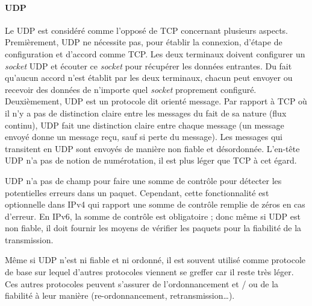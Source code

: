 \paragraph{UDP}
Le \gls{UDP} est considéré comme l'opposé de \gls{TCP} concernant plusieurs 
aspects. Premièrement, \gls{UDP} ne nécessite pas, pour établir la connexion, d'étape 
de configuration et d'accord comme \gls{TCP}. Les deux terminaux doivent 
configurer un \textit{socket} \gls{UDP} et écouter ce \textit{socket} pour récupérer 
les données entrantes. 
Du fait qu'aucun accord n'est établit par les deux terminaux, chacun 
peut envoyer ou recevoir des données de n'importe quel \textit{socket} proprement 
configuré.
Deuxièmement, \gls{UDP} est un protocole dit \og orienté message\fg{}. Par 
rapport à \gls{TCP} où il n'y a pas de distinction claire entre les messages du fait 
de sa nature (flux continu), \gls{UDP} fait une distinction claire entre chaque 
message (un message envoyé donne un message reçu, sauf si perte du 
message). Les messages qui transitent en \gls{UDP} sont envoyés de manière 
non fiable et désordonnée. L'en-tête \gls{UDP} n'a pas de notion de numérotation, il 
est plus léger que \gls{TCP} à cet égard.

\gls{UDP} n'a pas de champ pour faire une somme de contrôle pour détecter les 
potentielles erreurs dans un paquet. Cependant, cette fonctionnalité est optionnelle 
dans IPv4 qui rapport une somme de contrôle remplie de zéros en cas d'erreur. En 
IPv6, la somme de contrôle est obligatoire ; donc même si \gls{UDP} est non fiable, 
il doit fournir les moyens de vérifier les paquets pour la fiabilité de 
la transmission.

Même si \gls{UDP} n'est ni fiable et ni ordonné, il est souvent utilisé comme 
protocole de base sur lequel d'autres protocoles viennent se greffer car il reste très 
léger. Ces autres protocoles peuvent s'assurer de l'ordonnancement et / ou de la 
fiabilité à leur manière (re-ordonnancement, retransmission\dots). 

